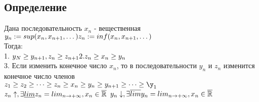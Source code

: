 ﻿\documentclass[12pt, a4paper]{article}
\newcommand{\nl}{\newline}
\begin{document}
\subsection{Определение}
Дана последовательность $ x_n $ - вещественная \nl
$ y_n:= sup(x_n,x_{n+1},\dots) \\
z_n:= inf(x_n,x_{n+1},\dots) $\\
Тогда: \\
1. $ y_N \geq y_{n+1} , z_n \geq z_{n+1} \\
2. z_n \geq x_n \geq y_n $\\
3. Если изменить конечное число $ x_n $, то в последовательности $ y_n $ и $ z_n $ изменится конечное число членов\nl \\
$z_1 \geq z_2 \geq \dots \geq z_n \geq x_n \geq y_n \geq y_{n+1} \geq \dots \geq \y_1$ \\
$ z_n\uparrow, \exists \underline{lim} z_n = lim_{n\rightarrow+\infty} , x_n \in \overline{\mathbb{R}} \\$
$ y_n\downarrow, \exists \overline{lim} y_n = lim_{n\rightarrow+\infty} , x_n \in \overline{\mathbb{R}} \\$
\end{document}
